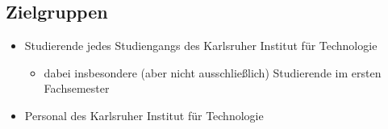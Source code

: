 \subsection{Zielgruppen}

\begin{itemize}
	\item Studierende jedes Studiengangs des Karlsruher Institut für Technologie
	\begin{itemize}
		\item dabei insbesondere (aber nicht ausschließlich) Studierende im ersten Fachsemester
	\end{itemize}
	\item Personal des Karlsruher Institut für Technologie
\end{itemize}